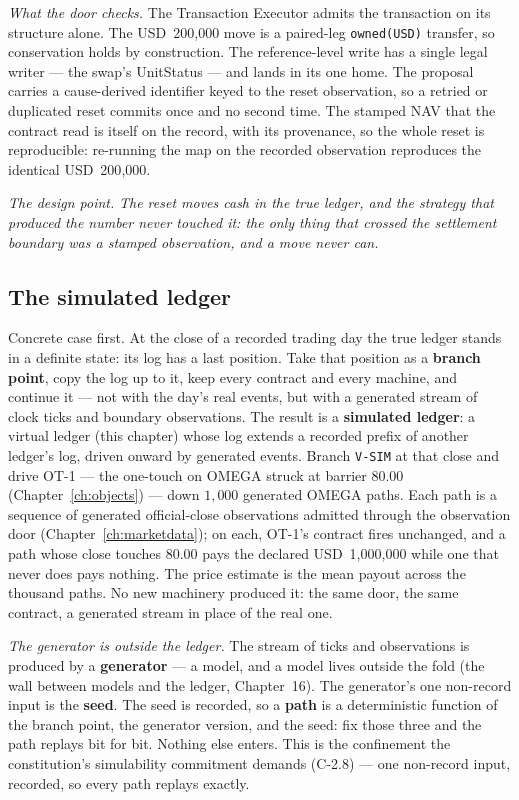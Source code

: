 \documentclass[11pt,a4paper]{article}
\newcommand{\USD}[1]{\mbox{USD~#1}}
\begin{document}
\emph{What the door checks.} The Transaction Executor admits the transaction on
its structure alone. The \USD{200{,}000} move is a paired-leg
\texttt{owned(USD)} transfer, so conservation holds by construction. The
reference-level write has a single legal writer --- the swap's UnitStatus --- and
lands in its one home. The proposal carries a cause-derived identifier keyed to
the reset observation, so a retried or duplicated reset commits once and no
second time. The stamped NAV that the contract read is itself on the record, with
its provenance, so the whole reset is reproducible: re-running the map on the
recorded observation reproduces the identical \USD{200{,}000}.

\emph{The design point.} \emph{The reset moves cash in the true ledger, and the
strategy that produced the number never touched it: the only thing that crossed
the settlement boundary was a stamped observation, and a move never can.}

\subsection{The simulated ledger}\label{sec:simulated}

Concrete case first. At the close of a recorded trading day the true ledger stands in a
definite state: its log has a last position. Take that position as a \textbf{branch point},
copy the log up to it, keep every contract and every machine, and continue it --- not with
the day's real events, but with a generated stream of clock ticks and boundary observations.
The result is a \textbf{simulated ledger}: a virtual ledger (this chapter) whose log extends
a recorded prefix of another ledger's log, driven onward by generated events. Branch
\texttt{V-SIM} at that close and drive OT-1 --- the one-touch on OMEGA struck at barrier
$80.00$ (Chapter~\ref{ch:objects}) --- down $1{,}000$ generated OMEGA paths. Each path is a
sequence of generated official-close observations admitted through the observation door
(Chapter~\ref{ch:marketdata}); on each, OT-1's contract fires unchanged, and a path whose
close touches $80.00$ pays the declared \USD{1{,}000{,}000} while one that never does pays
nothing. The price estimate is the mean payout across the thousand paths. No new machinery
produced it: the same door, the same contract, a generated stream in place of the real one.

\emph{The generator is outside the ledger.} The stream of ticks and observations is produced
by a \textbf{generator} --- a model, and a model lives outside the fold (the wall between
models and the ledger, Chapter~16). The generator's one
non-record input is the \textbf{seed}. The seed is recorded, so a \textbf{path} is a
deterministic function of the branch point, the generator version, and the seed: fix those
three and the path replays bit for bit. Nothing else enters. This is the confinement the
constitution's simulability commitment demands (C-2.8) --- one non-record input, recorded,
so every path replays exactly.
\end{document}
